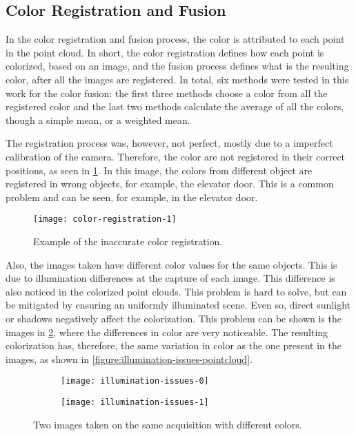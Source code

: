 \FloatBarrier

\subsection{Color Registration and Fusion}

In the color registration and fusion process, the color is attributed to each point in the point cloud. In short, the color registration defines how each point is colorized, based on an image, and the fusion process defines what is the resulting color, after all the images are registered. In total, six methods were tested in this work for the color fusion: the first three methods choose a color from all the registered color and the last two methods calculate the average of all the colors, though a simple mean, or a weighted mean.

The registration process was, however, not perfect, mostly due to a imperfect calibration of the camera. Therefore, the color are not registered in their correct positions, as seen in \cref{figure:wrong-registration-photocopy}. In this image, the colors from different object are registered in wrong objects, for example, the elevator door. This is a common problem and can be seen, for example, in the elevator door.

\begin{figure}[h]
    
    \centering
    \texttt{[image: color-registration-1]}

    \caption{Example of the inaccurate color registration.}
    \label{figure:wrong-registration-photocopy}
\end{figure}

Also, the images taken have different color values for the same objects. This is due to illumination differences at the capture of each image. This difference is also noticed in the colorized point clouds. This problem is hard to solve, but can be mitigated by ensuring an uniformly illuminated scene. Even so, direct sunlight or shadows negatively affect the colorization. This problem can be shown is the images in \cref{figure:illumination-issues-images}, where the differences in color are very noticeable. The resulting colorization has, therefore, the same variation in color as the one present in the images, as shown in \cref{figure:illumination-issues-pointcloud}.

\begin{figure}[h]
    
    \centering
    \begin{subfigure}{0.5\textwidth}
        \centering
        \texttt{[image: illumination-issues-0]}
    \end{subfigure}%
    \begin{subfigure}{0.5\textwidth}
        \centering
        \texttt{[image: illumination-issues-1]}
    \end{subfigure}%

    \caption{Two images taken on the same acquisition with different colors.}
    \label{figure:illumination-issues-images}

\end{figure}


